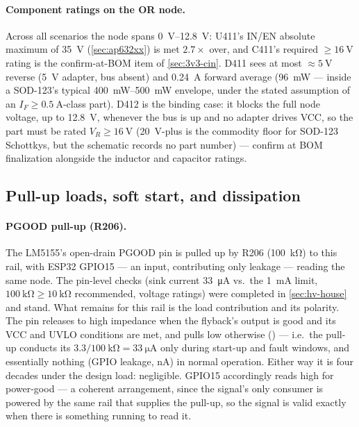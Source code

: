 \paragraph{Component ratings on the OR node.} Across all scenarios the node spans
\SIrange{0}{12.8}{\volt}: U411's IN/EN absolute maximum of \SI{35}{\volt}
(\cref{sec:ap632xx}) is met $2.7\times$ over, and C411's required $\geq\SI{16}{\volt}$
rating is the confirm-at-BOM item of \cref{sec:3v3-cin}. D411 sees at most
$\approx\SI{5}{\volt}$ reverse (5~V adapter, bus absent) and \SI{0.24}{\ampere}
forward average (\SI{96}{\milli\watt} --- inside a SOD-123's typical
\SIrange{400}{500}{\milli\watt} envelope, under the stated assumption of an
$I_F\geq\SI{0.5}{\ampere}$-class part). D412 is the binding case: it blocks the full
node voltage, up to \SI{12.8}{\volt}, whenever the bus is up and no adapter drives
VCC, so the part must be rated $V_R \geq \SI{16}{\volt}$ (\SI{20}{\volt}-plus is the
commodity floor for SOD-123 Schottkys, but the schematic records no part number) ---
confirm at BOM finalization alongside the inductor and capacitor ratings.

\subsection{Pull-up loads, soft start, and dissipation}\label{sec:3v3-house}

\paragraph{PGOOD pull-up (R206).} The LM5155's open-drain PGOOD pin is pulled up by
R206 (\SI{100}{\kilo\ohm}) to this rail, with ESP32 GPIO15 --- an input, contributing
only leakage --- reading the same node. The pin-level checks (sink current
\SI{33}{\micro\ampere} vs.\ the \SI{1}{\milli\ampere} limit,
$\SI{100}{\kilo\ohm} \geq \SI{10}{\kilo\ohm}$ recommended, voltage ratings) were
completed in \cref{sec:hv-house} and stand. What remains for this rail is the load
contribution and its polarity. The pin releases to high impedance when the flyback's
output is good and its VCC and UVLO conditions are met, and pulls low otherwise
() --- i.e.\ the pull-up conducts its
$3.3/\SI{100}{\kilo\ohm} = \SI{33}{\micro\ampere}$ only during start-up and fault
windows, and essentially nothing (GPIO leakage, \si{\nano\ampere}) in normal operation.
Either way it is four decades under the design load: negligible. GPIO15 accordingly
reads high for power-good --- a coherent arrangement, since the signal's only consumer
is powered by the same rail that supplies the pull-up, so the signal is valid exactly
when there is something running to read it.

